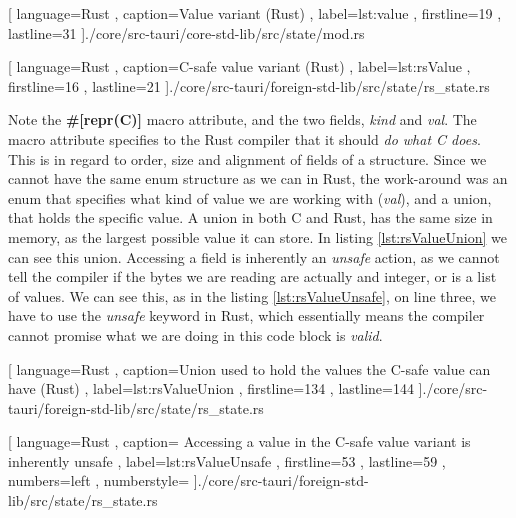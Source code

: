 \begin{code}[H]
  
    [ language=Rust
    , caption={Value variant (Rust)}
    , label=lst:value
    , firstline=19
    , lastline=31
    ]{./core/src-tauri/core-std-lib/src/state/mod.rs}
\end{code}

\begin{code}[H]
  
    [ language=Rust
    , caption={C-safe value variant (Rust)}
    , label=lst:rsValue
    , firstline=16
    , lastline=21
    ]{./core/src-tauri/foreign-std-lib/src/state/rs\_state.rs}
\end{code}

Note the \textbf{\#[repr(C)]} macro attribute, and the two fields,
\textit{kind} and \textit{val}. The macro attribute specifies to the Rust
compiler that it should \textit{do what C does}. This is in regard to order,
size and alignment of fields of a structure. Since we cannot have the same enum
structure as we can in Rust, the work-around was an enum that specifies what
kind of value we are working with (\textit{val}), and a union, that holds the
specific value. A union in both C and Rust, has the same size in memory, as the
largest possible value it can store. In listing \ref{lst:rsValueUnion} we can
see this union. Accessing a field is inherently an \textit{unsafe} action, as we
cannot tell the compiler if the bytes we are reading are actually and integer,
or is a list of values. We can see this, as in the listing
\ref{lst:rsValueUnsafe}, on line three, we have to use the \textit{unsafe}
keyword in Rust, which essentially means the compiler cannot promise what we are
doing in this code block is \textit{valid}.

\begin{code}
  
    [ language=Rust
    , caption={Union used to hold the values the C-safe value can have (Rust)}
    , label=lst:rsValueUnion
    , firstline=134
    , lastline=144
    ]{./core/src-tauri/foreign-std-lib/src/state/rs\_state.rs}
\end{code}

\begin{code}
  
    [ language=Rust
    , caption={
      Accessing a value in the C-safe value variant is inherently unsafe
    }
    , label=lst:rsValueUnsafe
    , firstline=53
    , lastline=59
    , numbers=left
    , numberstyle=\tiny\color{gray}
    ]{./core/src-tauri/foreign-std-lib/src/state/rs\_state.rs}
\end{code}

